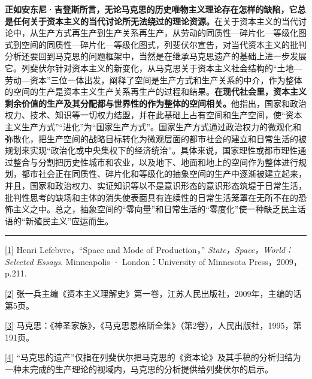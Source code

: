 \documentclass[UTF8, fontset = sourcesans, a4paper, oneside, zihao =
-4, scheme=chinese, no-math, space=true]{ctexbook}
\begin{document}
\textbf{正如安东尼·吉登斯所言，无论马克思的历史唯物主义理论存在怎样的缺陷，它总是任何关于资本主义的当代讨论所无法绕过的理论资源。}在关于资本主义的当代讨论中，从生产方式再生产到生产关系再生产，从劳动的同质性---碎片化---等级化图式到空间的同质性---碎片化---等级化图式，列斐伏尔宣告，对当代资本主义的批判分析还要回到马克思的问题框架中，当然是在继承马克思遗产的基础上进一步发展它。列斐伏尔针对资本主义的新变化，从马克思关于资本主义社会结构的``土地---劳动---资本''三位一体出发，阐释了空间是生产方式和生产关系的中介，作为整体的空间的生产是资本主义生产关系再生产的过程和结果。\textbf{在现代社会里，资本主义剩余价值的生产及其分配都与世界性的作为整体的空间相关。}他指出，国家和政治权力、技术、知识等一切权力结盟，并在此基础上占有空间和生产空间，使``资本主义生产方式''``进化''为``国家生产方式''。国家生产方式通过政治权力的微观化和弥散化，把生产空间的战略目标转化为微观层面的都市社会的建立和日常生活的被规划来实现``政治化或中央集权下的经济统治''。具体来说，国家理性或都市理性通过整合与分割把历史性城市和农业，以及地下、地面和地上的空间作为整体进行规划，都市社会正在同质性、碎片化和等级化的抽象空间的生产中逐渐被建立起来，并且，国家和政治权力、实证知识等以不是意识形态的意识形态筑堤于日常生活，批判性思考的缺场和主体的消失使表面具有连续性的日常生活笼罩在无所不在的恐怖主义之中。总之，抽象空间的``零向量''和日常生活的``零度化''使一种缺乏民主话语的``新殖民主义''应运而生。

\begin{center}\rule{0.5\linewidth}{\linethickness}\end{center}

\protect\hypertarget{part0007_split_004.htmlux5cux23m1}{}{}\protect\hyperlink{part0007_split_000.htmlux5cux23w1}{{[}1{]}}
Henri Lefebvre，``Space and Mode of Production，''
\emph{State，Space，World：Selected Essays}. Minneapolis ·
London：University of Minnesota Press，2009，p.211.

\protect\hypertarget{part0007_split_004.htmlux5cux23m2}{}{}\protect\hyperlink{part0007_split_000.htmlux5cux23w2}{{[}2{]}}
张一兵主编《资本主义理解史》第一卷，江苏人民出版社，2009年，主编的话第5页。

\protect\hypertarget{part0007_split_004.htmlux5cux23m3}{}{}\protect\hyperlink{part0007_split_001.htmlux5cux23w3}{{[}3{]}}
马克思：《神圣家族》，《马克思恩格斯全集》（第2卷），人民出版社，1995，第191页。

\protect\hypertarget{part0007_split_004.htmlux5cux23m4}{}{}\protect\hyperlink{part0007_split_001.htmlux5cux23w4}{{[}4{]}}
``马克思的遗产''仅指在列斐伏尔把马克思的《资本论》及其手稿的分析归结为一种未完成的生产理论的视域内，马克思的分析提供给列斐伏尔的启示。
\end{document}
